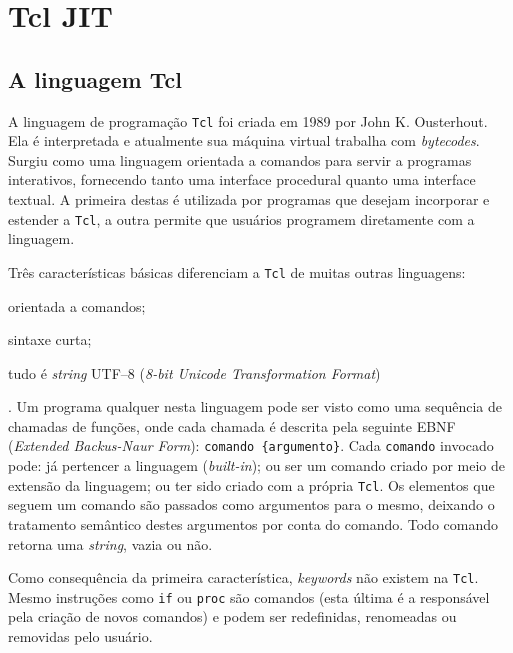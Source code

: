 \chapter{Tcl JIT}
\label{tcljit}


\section{A linguagem Tcl}

A linguagem de programação \texttt{Tcl} foi criada em 1989 por John
K. Ousterhout. Ela é interpretada e atualmente sua máquina virtual
trabalha com \textit{bytecodes}. Surgiu como uma linguagem orientada a
comandos para servir a programas interativos, fornecendo tanto uma
interface procedural quanto uma interface textual. A primeira destas é
utilizada por programas que desejam incorporar e estender a
\texttt{Tcl}, a outra permite que usuários programem diretamente com a
linguagem.

Três características básicas diferenciam a \texttt{Tcl} de muitas
outras linguagens: \begin{inparaenum}[(1)]
\item orientada a comandos; \item sintaxe curta; \item tudo é
  \textit{string} UTF--8 (\textit{8-bit Unicode Transformation
   Format})\end{inparaenum}. Um programa qualquer nesta
linguagem pode ser visto como uma sequência de chamadas de funções, onde
cada chamada é descrita pela seguinte EBNF (\textit{Extended
  Backus-Naur Form}): 
\verb!comando {argumento}!. Cada \verb!comando! invocado pode: já
pertencer a linguagem (\textit{built-in}); ou
ser um comando criado por meio de extensão da linguagem; ou ter
sido criado com a própria \texttt{Tcl}. Os elementos que seguem um comando
são passados como argumentos para o mesmo, deixando o tratamento
semântico destes argumentos por conta do comando. Todo comando retorna uma
\textit{string}, vazia ou não.

Como consequência da primeira característica, \textit{keywords} não
existem na \texttt{Tcl}. Mesmo instruções como
\verb!if! ou \verb!proc! são comandos (esta última é a responsável
pela criação de novos comandos) e podem ser redefinidas, renomeadas ou
removidas pelo usuário.


